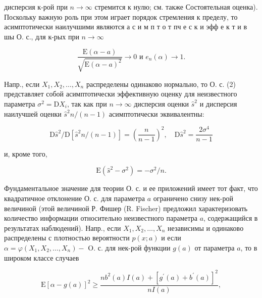 \documentclass[10pt]{article}
\begin{document}
дисперсия к-рой при $n \rightarrow \infty$ стремится к нулю; см. также Состоятельная оценка). Поскольку важную роль при этом играет порядок стремления к пределу, то асимптотически наилучшими являются а с и м п т о т пч е с к и эфф е к т и в шы О. с., для к-рых при $n \rightarrow \infty$



\[

\frac{\mathrm{E}(\alpha-a)}{\sqrt{\mathrm{E}(\alpha-a)^{2}}} \longrightarrow 0 \text { и } e_{n}(\alpha) \longrightarrow 1 .

\]



Напр., если $X_{1}, X_{2}, \ldots, X_{n}$ распределены одинаково нормально, то О. с. (2) представляет собой асимптотически эффективную оценку для неизвестного параметра $\sigma^{2}=\mathrm{D} X_{i}$, так как при $n \rightarrow \infty$ дисперсия оценки $\hat{s}^{2}$ и дисперсия наилучшей оценки $\hat{s}^{2} n /(n-1)$ асимптотически эквивалентны:



\[

\mathrm{D} \hat{s}^{2} / \mathrm{D}\left[\hat{s}^{2} n /(n-1)\right]=\left(\frac{n}{n-1}\right)^{2}, \quad \mathrm{D} \hat{s}^{2}=\frac{2 \sigma^{4}}{n-1}

\]



и, кроме того,



\[

\mathrm{E}\left(\hat{s}^{2}-\sigma^{2}\right)=-\sigma^{2} / n .

\]



Фундаментальное значение для теории О. с. и ее приложений имеет тот факт, что квадратичное отклонение О. с. для параметра $a$ ограничено снизу нек-рой величиной (этой величиной Р. Фишер (R. Fischer) предложил характеризовать количество информации относительно неизвестного параметра $a$, содержащийся в результатах наблюдений). Напр., если $X_{1}, X_{2}, \ldots, X_{n}$ независимы и одинаково распределены с плотностью вероятности $p(x ; a)$ и если $\alpha=\varphi\left(X_{1}, X_{2}, \ldots, X_{n}\right)-$ O. с. для нек-рой функции $g(a)$ от параметра $a$, то в широком классе случаев



\[

\mathrm{E}[\alpha-g(a)]^{2} \geqslant \frac{n b^{2}(a) I(a)+\left[g^{\prime}(a)+b^{\prime}(a)\right]^{2}}{n I(a)},

\]
\end{document}
